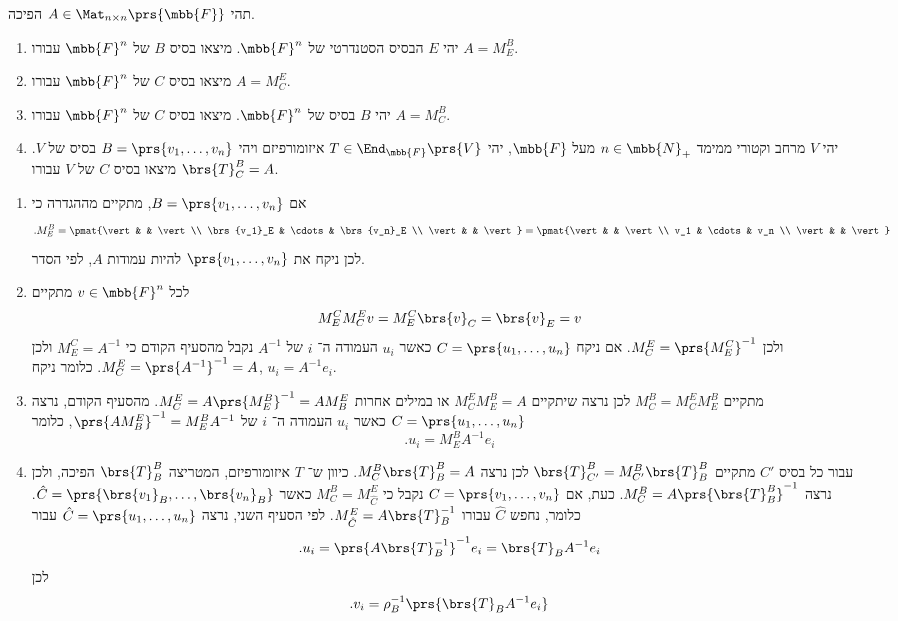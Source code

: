 \documentclass[a4paper,10pt,twoside,openany]{book}
\begin{document}
\begin{exercisechap}
תהי
$A \in \Mat_{n \times n}\prs{\mbb{F}}$
הפיכה.
\begin{enumerate}
\item יהי
$E$
הבסיס הסטנדרטי של
$\mbb{F}^n$.
מיצאו בסיס
$B$
של
$\mbb{F}^n$
עבורו
$A = M^B_E$.

\item
מיצאו בסיס
$C$
של
$\mbb{F}^n$
עבורו
$A = M^E_C$.

\item
יהי
$B$
בסיס של
$\mbb{F}^n$.
מיצאו בסיס
$C$
של
$\mbb{F}^n$
עבורו
$A = M^B_C$.

\item
יהי
$V$
מרחב וקטורי ממימד
$n \in \mbb{N}_+$
מעל
$\mbb{F}$,
יהי
$T \in \End_{\mbb{F}}\prs{V}$
איזומורפיזם
ויהי
$B = \prs{v_1, \ldots, v_n}$
בסיס של
$V$.
מיצאו בסיס
$C$
של
$V$
עבורו
$\brs{T}^B_C = A$.
\end{enumerate}
\end{exercisechap}

\begin{solution}
\begin{enumerate}
\item
אם
$B = \prs{v_1, \ldots, v_n}$,
מתקיים מההגדרה כי
\[\text{.} M^B_E = \pmat{\vert & & \vert \\ \brs{v_1}_E & \cdots & \brs{v_n}_E \\ \vert & & \vert} = \pmat{\vert & & \vert \\ v_1 & \cdots & v_n \\ \vert & & \vert}\]
לכן ניקח את
$\prs{v_1, \ldots, v_n}$
להיות עמודות
$A$,
לפי הסדר.

\item
לכל
$v \in \mbb{F}^n$
מתקיים
\[M^C_E M^E_C v = M^C_E \brs{v}_C = \brs{v}_E = v\]
ולכן
$M^E_C = \prs{M^C_E}^{-1}$.
אם ניקח
$C = \prs{u_1, \ldots, u_n}$
כאשר
$u_i$
העמודה ה־%
$i$
של
$A^{-1}$
נקבל מהסעיף הקודם כי
$M^C_E = A^{-1}$
ולכן
$M^E_C = \prs{A^{-1}}^{-1} = A$.
כלומר ניקח,
$u_i = A^{-1} e_i$.

\item
מתקיים
$M^B_C = M^E_C M^B_E$
לכן נרצה שיתקיים
$M^E_C M^B_E = A$
או במילים אחרות
$M^E_C = A \prs{M^B_E}^{-1} = A M^E_B$.
מהסעיף הקודם, נרצה
$C = \prs{u_1, \ldots, u_n}$
כאשר
$u_i$
העמודה ה־%
$i$
של
$\prs{A M^E_B}^{-1} = M^B_E A^{-1}$,
כלומר
\[\text{.} u_i = M^B_E A^{-1} e_i\]

\item
עבור כל בסיס
$C'$
מתקיים
$\brs{T}^B_{C'} = M^B_{C'} \brs{T}^B_B$
לכן נרצה
$M^B_C \brs{T}^B_B = A$.
כיוון ש־%
$T$
איזומורפיזם, המטריצה
$\brs{T}^B_B$
הפיכה, ולכן נרצה
$M^B_C = A \prs{\brs{T}^B_B}^{-1}$.
כעת, אם
$C = \prs{v_1, \ldots, v_n}$
נקבל כי
$M^B_C = M^E_{\hat{C}}$
כאשר
$\hat{C} = \prs{\brs{v_1}_B, \ldots, \brs{v_n}_B}$.
כלומר, נחפש
$\hat{C}$
עבורו
$M^E_{\hat{C}} = A \brs{T}_B^{-1}$.
לפי הסעיף השני, נרצה
$\hat{C} = \prs{u_1, \ldots, u_n}$
עבור
\[\text{.} u_i = \prs{A \brs{T}_B^{-1}}^{-1} e_i = \brs{T}_B A^{-1} e_i\]
לכן
\[\text{.} v_i = \rho_B^{-1} \prs{\brs{T}_B A^{-1} e_i}\]
\end{enumerate}
\end{solution}
\end{document}
